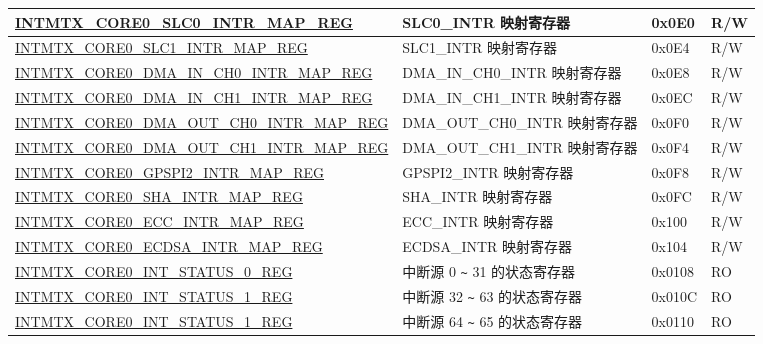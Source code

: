 \begin{longtable}{ | p{10cm} | p{10cm} | p{1.3cm} | p{1cm} | }
\hyperref[regdesc:INTMTXCORE0SLC0INTRMAPREG]{INTMTX\_CORE0\_SLC0\_INTR\_MAP\_REG} & SLC0\_INTR 映射寄存器 & 0x0E0 & R/W  \\ \hline
\hyperref[regdesc:INTMTXCORE0SLC1INTRMAPREG]{INTMTX\_CORE0\_SLC1\_INTR\_MAP\_REG} & SLC1\_INTR 映射寄存器 & 0x0E4 & R/W  \\ \hline
\hyperref[regdesc:INTMTXCORE0DMAINCH0INTRMAPREG]{INTMTX\_CORE0\_DMA\_IN\_CH0\_INTR\_MAP\_REG} & DMA\_IN\_CH0\_INTR 映射寄存器 & 0x0E8 & R/W  \\ \hline
\hyperref[regdesc:INTMTXCORE0DMAINCH1INTRMAPREG]{INTMTX\_CORE0\_DMA\_IN\_CH1\_INTR\_MAP\_REG} & DMA\_IN\_CH1\_INTR 映射寄存器 & 0x0EC & R/W  \\ \hline
\hyperref[regdesc:INTMTXCORE0DMAOUTCH0INTRMAPREG]{INTMTX\_CORE0\_DMA\_OUT\_CH0\_INTR\_MAP\_REG} & DMA\_OUT\_CH0\_INTR 映射寄存器 & 0x0F0 & R/W  \\ \hline
\hyperref[regdesc:INTMTXCORE0DMAOUTCH1INTRMAPREG]{INTMTX\_CORE0\_DMA\_OUT\_CH1\_INTR\_MAP\_REG} & DMA\_OUT\_CH1\_INTR 映射寄存器 & 0x0F4 & R/W  \\ \hline
\hyperref[regdesc:INTMTXCORE0GPSPI2INTRMAPREG]{INTMTX\_CORE0\_GPSPI2\_INTR\_MAP\_REG} & GPSPI2\_INTR 映射寄存器 & 0x0F8 & R/W  \\ \hline
\hyperref[regdesc:INTMTXCORE0SHAINTRMAPREG]{INTMTX\_CORE0\_SHA\_INTR\_MAP\_REG} & SHA\_INTR 映射寄存器 & 0x0FC & R/W  \\ \hline
\hyperref[regdesc:INTMTXCORE0ECCINTRMAPREG]{INTMTX\_CORE0\_ECC\_INTR\_MAP\_REG} & ECC\_INTR 映射寄存器 & 0x100 & R/W  \\ \hline
\hyperref[regdesc:INTMTXCORE0ECDSAINTRMAPREG]{INTMTX\_CORE0\_ECDSA\_INTR\_MAP\_REG} & ECDSA\_INTR 映射寄存器 & 0x104 & R/W  \\ \hline

\hyperref[regdesc:INTMTXCORE0INTSTATUS0REG]{INTMTX\_CORE0\_INT\_STATUS\_0\_REG} & 中断源 0 \verb+~+ 31 的状态寄存器 & 0x0108 & RO \\ \hline
\hyperref[regdesc:INTMTXCORE0INTSTATUS1REG]{INTMTX\_CORE0\_INT\_STATUS\_1\_REG} & 中断源 32 \verb+~+ 63 的状态寄存器 & 0x010C & RO \\ \hline
\hyperref[regdesc:INTMTXCORE0INTSTATUS1REG]{INTMTX\_CORE0\_INT\_STATUS\_1\_REG} & 中断源 64 \verb+~+ 65 的状态寄存器 & 0x0110 & RO \\ \hline


\end{longtable}
